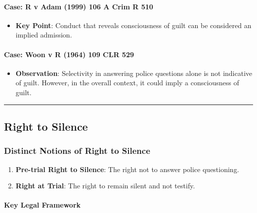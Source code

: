 \paragraph{Case: R v Adam (1999) 106 A Crim R
510}\label{case-r-v-adam-1999-106-a-crim-r-510}

\begin{itemize}
\tightlist
\item
  \textbf{Key Point}: Conduct that reveals consciousness of guilt can be
  considered an implied admission.
\end{itemize}

\paragraph{Case: Woon v R (1964) 109 CLR
529}\label{case-woon-v-r-1964-109-clr-529}

\begin{itemize}
\tightlist
\item
  \textbf{Observation}: Selectivity in answering police questions alone
  is not indicative of guilt. However, in the overall context, it could
  imply a consciousness of guilt.
\end{itemize}

\begin{center}\rule{0.5\linewidth}{0.5pt}\end{center}

\subsection{ Right to Silence}\label{right-to-silence}

\subsubsection{Distinct Notions of Right to
Silence}\label{distinct-notions-of-right-to-silence}

\begin{enumerate}
\def\labelenumi{\arabic{enumi}.}
\tightlist
\item
  \textbf{Pre-trial Right to Silence}: The right not to answer police
  questioning.
\item
  \textbf{Right at Trial}: The right to remain silent and not testify.
\end{enumerate}

\paragraph{Key Legal Framework}\label{key-legal-framework}

